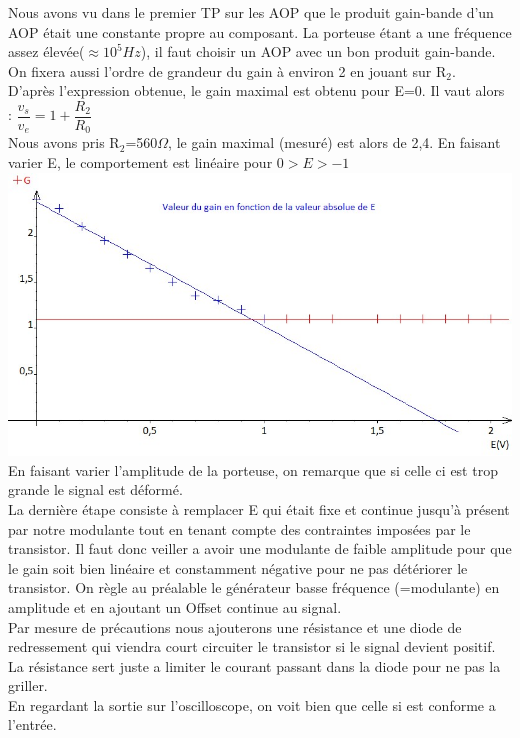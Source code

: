 \documentclass[12pt,a4paper]{article}
\begin{document}
\begin{enumerate}
\begin{multicols}{2}
\end{multicols}
Nous avons vu dans le premier TP sur les AOP que le produit gain-bande d'un AOP était une constante propre au composant. La porteuse étant a une fréquence assez élevée($\approx 10^5Hz$), il faut choisir un AOP avec un bon produit gain-bande. On fixera aussi l'ordre de grandeur du gain à environ 2 en jouant sur R$_2$.\\
D'après l'expression obtenue, le gain maximal est obtenu pour E=0. Il vaut alors : $\dfrac{v_s}{v_e}=1+\dfrac {R_{2}} {R_{0}}$\\
Nous avons pris R$_2$=560$\Omega$, le gain maximal (mesuré) est alors de 2,4. En faisant varier E, le comportement est linéaire pour $0>E>-1$\\
\includegraphics[scale=0.5]{Gain.jpg}
En faisant varier l'amplitude de la porteuse, on remarque que si celle ci est trop grande le signal est déformé.\\
La dernière étape consiste à remplacer E qui était fixe et continue jusqu'à présent par notre modulante tout en tenant compte des contraintes imposées par le transistor. Il faut donc veiller a avoir une modulante de faible amplitude pour que le gain soit bien linéaire et constamment négative pour ne pas détériorer le transistor. On règle au préalable le générateur basse fréquence (=modulante) en amplitude et en ajoutant un Offset continue au signal.\\
Par mesure de précautions nous ajouterons une résistance et une diode de redressement qui viendra court circuiter le transistor si le signal devient positif. La résistance sert juste a limiter le courant passant dans la diode pour ne pas la griller.\\
En regardant la sortie sur l'oscilloscope, on voit bien que celle si est conforme a l'entrée.\\

\end{enumerate}
\end{document}
